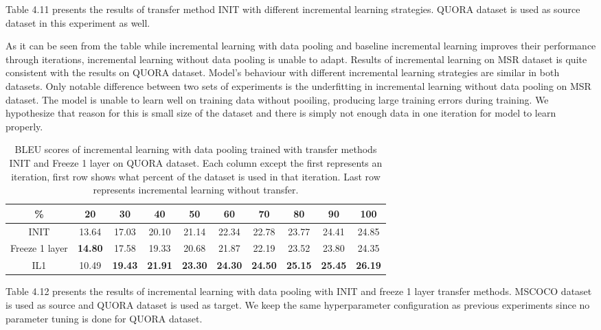 Table 4.11 presents the results of transfer method INIT with different incremental learning strategies. QUORA dataset is used as source dataset in this experiment as well. 

As it can be seen from the table while incremental learning with data pooling and baseline incremental learning improves their performance through iterations, incremental learning without data pooling is unable to adapt. Results of incremental learning on MSR dataset is quite consistent with the results on QUORA dataset. Model's behaviour with different incremental learning strategies are similar in both datasets. Only notable difference between two sets of experiments is the underfitting in incremental learning without data pooling on MSR dataset. The model is unable to learn well on training data without pooiling, producing large training errors during training. We hypothesize that reason for this is small size of the dataset and there is simply not enough data in one iteration for model to learn properly. 

\begin{table}[b]
\centering
\large
\begin{adjustbox}{width=1.2\textwidth,center=\textwidth} 
 \begin{tabular}{|c | c | c | c | c | c | c | c | c | c |} 
 \hline
 \% & 20 & 30 & 40 & 50 & 60 & 70 & 80 & 90 & 100 \\ [0.5ex] 
 \hline
  INIT & 13.64 & 17.03 & 20.10 & 21.14 & 22.34 & 22.78 & 23.77 & 24.41 & 24.85  \\ 
 \hline
  Freeze 1 layer &  \textbf{14.80} & 17.58 & 19.33 & 20.68 & 21.87 & 22.19 & 23.52 & 23.80 & 24.35 \\ 
  \hline
  IL1 & 10.49 &  \textbf{19.43} & \textbf{21.91} &  \textbf{23.30} &  \textbf{24.30} &  \textbf{24.50} &  \textbf{25.15} &  \textbf{25.45} &  \textbf{26.19}  \\ 
 \hline
\end{tabular}
\end{adjustbox}
\caption{BLEU scores of incremental learning with data pooling trained with transfer methods INIT and Freeze 1 layer on QUORA dataset. Each column except the first represents an iteration, first row shows what percent of the dataset is used in that iteration. Last row represents incremental learning without transfer.}
\end{table}

Table 4.12 presents the results of incremental learning with data pooling with INIT and freeze 1 layer transfer methods. MSCOCO dataset is used as source and QUORA dataset is used as target. We keep the same hyperparameter configuration as previous experiments since no parameter tuning is done for QUORA dataset.

